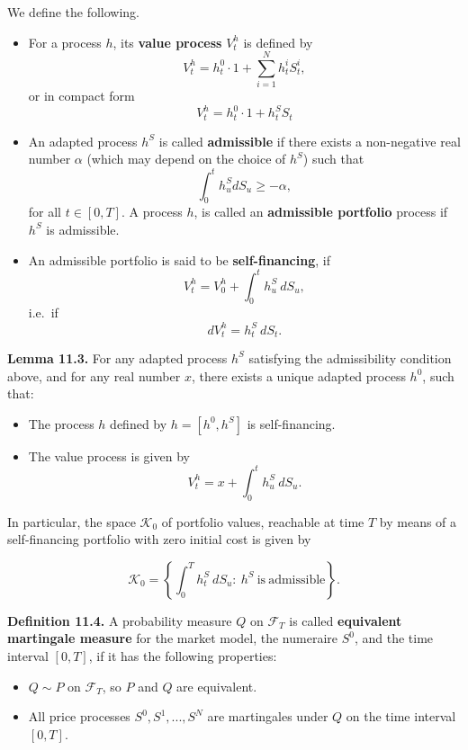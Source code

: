 \documentclass[
]{article}
\providecommand{\tightlist}{%
  \setlength{\itemsep}{0pt}\setlength{\parskip}{0pt}}
\begin{document}
We define the following.

\begin{itemize}
\tightlist
\item
  For a process \(h\), its \textbf{value process} \(V_t^h\) is defined
  by \[
    V_t^h=h^0_t\cdot 1+\sum_{i=1}^Nh_t^iS_t^i,
    \] or in compact form \[
    V_t^h=h_t^0\cdot 1 + h_t^S S_t
    \]
\item
  An adapted process \(h^S\) is called \textbf{admissible} if there
  exists a non-negative real number \(\alpha\) (which may depend on the
  choice of \(h^S\)) such that \[
    \int_0^th_u^SdS_u\ge -\alpha,
    \] for all \(t\in[0,T]\). A process \(h\), is called an
  \textbf{admissible portfolio} process if \(h^S\) is admissible.
\item
  An admissible portfolio is said to be \textbf{self-financing}, if \[
    V_t^h=V_0^h+\int_0^th_u^S\ dS_u,
    \] i.e.~if \[
    dV_t^h=h_t^S\ dS_t.
    \]
\end{itemize}

\textbf{Lemma 11.3.} For any adapted process \(h^S\) satisfying the
admissibility condition above, and for any real number \(x\), there
exists a unique adapted process \(h^0\), such that:

\begin{itemize}
\tightlist
\item
  The process \(h\) defined by \(h=[h^0,h^S]\) is self-financing.
\item
  The value process is given by \[
    V_t^h=x+\int_0^th_u^S\ dS_u.
    \]
\end{itemize}

In particular, the space \(\mathcal{K}_0\) of portfolio values,
reachable at time \(T\) by means of a self-financing portfolio with zero
initial cost is given by

\[
\mathcal{K}_0=\left\{\int_0^Th_t^S\ dS_u :\ h^S\ \text{is}\ \text{admissible}\right\}.
\]

\textbf{Definition 11.4.} A probability measure \(Q\) on
\(\mathcal{F}_T\) is called \textbf{equivalent martingale measure} for
the market model, the numeraire \(S^0\), and the time interval
\([0,T]\), if it has the following properties:

\begin{itemize}
\tightlist
\item
  \(Q\sim P\) on \(\mathcal{F}_T\), so \(P\) and \(Q\) are equivalent.
\item
  All price processes \(S^0,S^1,...,S^N\) are martingales under \(Q\) on
  the time interval \([0,T]\).
\end{itemize}
\end{document}
